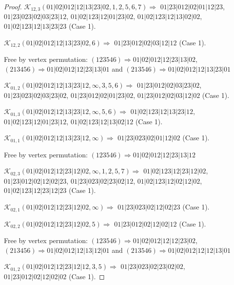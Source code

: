 \documentclass[12pt]{article}
\theoremstyle{plain}
\theoremstyle{definition}
\theoremstyle{remark}
\newcommand{\fancy}[1]{\mathcal{#1}}
\def\K{\fancy{K}}
\begin{document}
\begin{proof}
	
	
	\bigskip
	
	$\K_{12,3}(01|02|012|12|13|23|02,1, 2, 5, 6, 7)\Rightarrow $ $01|23|012|02|01|12|23$, $01|23|023|02|03|23|12$, $01|02|123|12|01|23|02$, $01|02|123|12|13|02|02$, $01|02|123|12|13|23|23$ (Case 1).
	
	$\K_{12,2}(01|02|012|12|13|23|02,6)\Rightarrow $ $01|23|012|02|03|12|12$ (Case 1).
	
	
	
	Free by vertex permutation: $(1 2 3 5 4 6)\Rightarrow 01|02|012|12|23|13|02$, $(2 1 3 4 5 6)\Rightarrow 01|02|012|12|23|13|01$ and $(2 1 3 5 4 6)\Rightarrow 01|02|012|12|13|23|01$
	
	
	
	\bigskip
	
	$\K_{01,2}(01|02|012|12|13|23|12,\infty,3, 5, 6)\Rightarrow $ $01|23|012|02|03|23|02$, $01|23|023|02|03|23|02$, $01|23|012|02|01|23|02$, $01|23|012|02|03|12|02$ (Case 1).
	
	$\K_{01,3}(01|02|012|12|13|23|12,\infty,5, 6)\Rightarrow $ $01|02|123|12|13|23|12$, $01|02|123|12|01|23|12$, $01|02|123|12|13|02|12$ (Case 1).
	
	$\K_{01,1}(01|02|012|12|13|23|12,\infty)\Rightarrow $ $01|23|023|02|01|12|02$ (Case 1).
	
	
	
	Free by vertex permutation: $(1 2 3 5 4 6)\Rightarrow 01|02|012|12|23|13|12$
	
	
	
	\bigskip
	
	$\K_{02,3}(01|02|012|12|23|12|02,\infty,1, 2, 5, 7)\Rightarrow $ $01|02|123|12|23|12|02$, $01|23|012|02|12|02|23$, $01|23|023|02|23|02|12$, $01|02|123|12|02|12|02$, $01|02|123|12|23|12|23$ (Case 1).
	
	$\K_{02,1}(01|02|012|12|23|12|02,\infty)\Rightarrow $ $01|23|023|02|12|02|23$ (Case 1).
	
	$\K_{02,2}(01|02|012|12|23|12|02,5)\Rightarrow $ $01|23|012|02|12|02|12$ (Case 1).
	
	
	
	Free by vertex permutation: $(1 2 3 5 4 6)\Rightarrow 01|02|012|12|12|23|02$, $(2 1 3 4 5 6)\Rightarrow 01|02|012|12|13|12|01$ and $(2 1 3 5 4 6)\Rightarrow 01|02|012|12|12|13|01$
	
	
	
	\bigskip
	
	$\K_{01,2}(01|02|012|12|23|12|12,3, 5)\Rightarrow $ $01|23|023|02|23|02|02$, $01|23|012|02|12|02|02$ (Case 1).
	

\end{proof}
\end{document}
